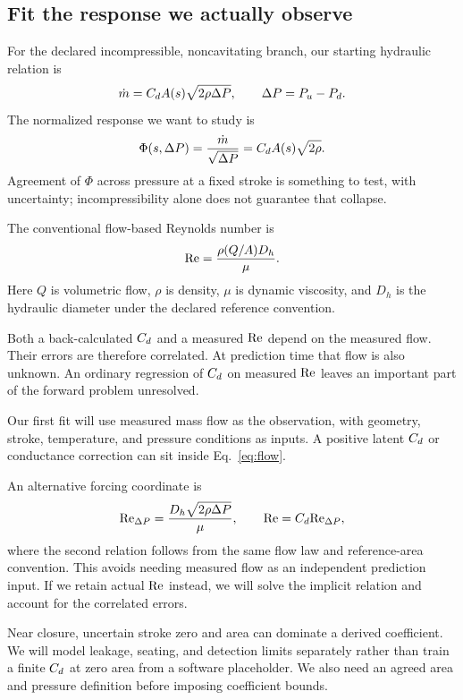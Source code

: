 \subsection{Fit the response we actually observe}

For the declared incompressible, noncavitating branch, our starting hydraulic relation is
\begin{equation}
\dot m=C_d A(s)\sqrt{2\rho\Delta P},
\qquad \Delta P=P_u-P_d.
\label{eq:flow}
\end{equation}
The normalized response we want to study is
\begin{equation}
\Phi(s,\Delta P)=\frac{\dot m}{\sqrt{\Delta P}}
               =C_d A(s)\sqrt{2\rho}.
\end{equation}
Agreement of $\Phi$ across pressure at a fixed stroke is something to test, with uncertainty; incompressibility alone does not guarantee that collapse.

The conventional flow-based Reynolds number is
\begin{equation}
\mathrm{Re}=\frac{\rho(Q/A)D_h}{\mu}.
\end{equation}
Here $Q$ is volumetric flow, $\rho$ is density, $\mu$ is dynamic viscosity, and $D_h$ is the hydraulic diameter under the declared reference convention.

Both a back-calculated $C_d$ and a measured $\mathrm{Re}$ depend on the measured flow. Their errors are therefore correlated. At prediction time that flow is also unknown. An ordinary regression of $C_d$ on measured $\mathrm{Re}$ leaves an important part of the forward problem unresolved.

Our first fit will use measured mass flow as the observation, with geometry, stroke, temperature, and pressure conditions as inputs. A positive latent $C_d$ or conductance correction can sit inside Eq.~\eqref{eq:flow}.

An alternative forcing coordinate is
\begin{equation}
\mathrm{Re}_{\Delta P}=\frac{D_h\sqrt{2\rho\Delta P}}{\mu},
\qquad
\mathrm{Re}=C_d\mathrm{Re}_{\Delta P},
\label{eq:forcing}
\end{equation}
where the second relation follows from the same flow law and reference-area convention. This avoids needing measured flow as an independent prediction input. If we retain actual $\mathrm{Re}$ instead, we will solve the implicit relation and account for the correlated errors.

Near closure, uncertain stroke zero and area can dominate a derived coefficient. We will model leakage, seating, and detection limits separately rather than train a finite $C_d$ at zero area from a software placeholder. We also need an agreed area and pressure definition before imposing coefficient bounds.

